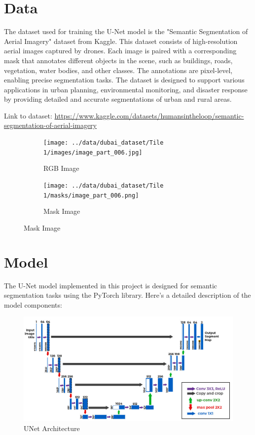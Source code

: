 \documentclass{article}
\begin{document}
\section{Data}
The dataset used for training the U-Net model is the "Semantic Segmentation of Aerial Imagery" dataset from Kaggle. This dataset consists of high-resolution aerial images captured by drones. Each image is paired with a corresponding mask that annotates different objects in the scene, such as buildings, roads, vegetation, water bodies, and other classes. The annotations are pixel-level, enabling precise segmentation tasks. The dataset is designed to support various applications in urban planning, environmental monitoring, and disaster response by providing detailed and accurate segmentations of urban and rural areas.

Link to dataset: \url{https://www.kaggle.com/datasets/humansintheloop/semantic-segmentation-of-aerial-imagery}

\begin{figure}[htbp]
    \centering
    \begin{subfigure}{0.45\textwidth}
        \centering
        \texttt{[image: ../data/dubai\_dataset/Tile 1/images/image\_part\_006.jpg]}
        \caption{RGB Image}
    \end{subfigure}
    \hfill
    \begin{subfigure}{0.45\textwidth}
        \centering
        \texttt{[image: ../data/dubai\_dataset/Tile 1/masks/image\_part\_006.png]}
        \caption{Mask Image}
    \end{subfigure}
\end{figure}

\section{Model}
The U-Net model implemented in this project is designed for semantic segmentation tasks using the PyTorch library. Here’s a detailed description of the model components:

\begin{figure}[htbp]
    \centering
    \includegraphics[width=0.8\linewidth]{../assets/UNet.jpg}
    \caption{UNet Architecture}
    \label{fig:metrics_over_epochs}
\end{figure}
\end{document}
